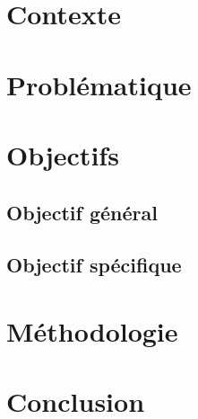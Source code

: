 	\section{Contexte}
	
	\section{Problématique}
	
	\section{Objectifs}
	
		\subsection{Objectif général}
		
		\subsection{Objectif spécifique}
		
	\section{Méthodologie}
	
	\section*{Conclusion}
